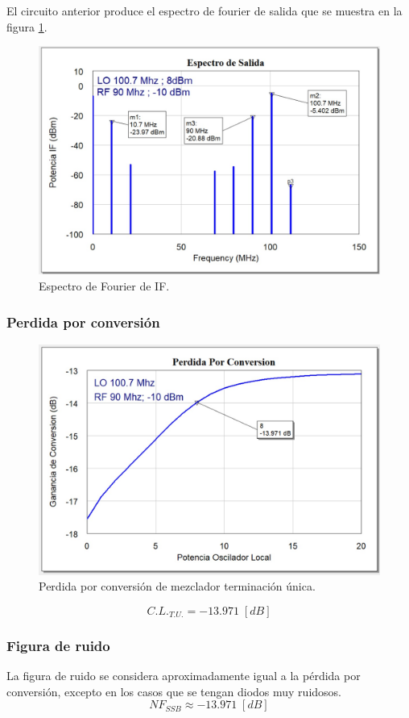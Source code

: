 \documentclass[twocolumn]{article}
\begin{document}
El circuito anterior produce el espectro de fourier de salida que se muestra en la figura \textcolor{blue}{\ref{fig:IF1}}.
\begin{figure}[h]
  \centering    
	\includegraphics[scale=0.28]{imagenes/IF1.jpg}
	\caption{Espectro de Fourier de IF.}\label{fig:IF1}
\end{figure}
%
\subsubsection{Perdida por conversión}
%
\begin{figure}[h]
  \centering    
	\includegraphics[width=\columnwidth]{imagenes/CL1.jpg}
	\caption{Perdida por conversión de mezclador terminación única.}\label{fig:CL1}
\end{figure}
\[C.L._{T.U.} = -13.971 \; [dB] \]
%
\subsubsection{Figura de ruido}
%
La figura de ruido se considera aproximadamente igual a la pérdida por conversión, excepto en los casos que se tengan diodos muy ruidosos.
\[NF_{SSB} \approx -13.971 \; [dB] \]
%
\end{document}
